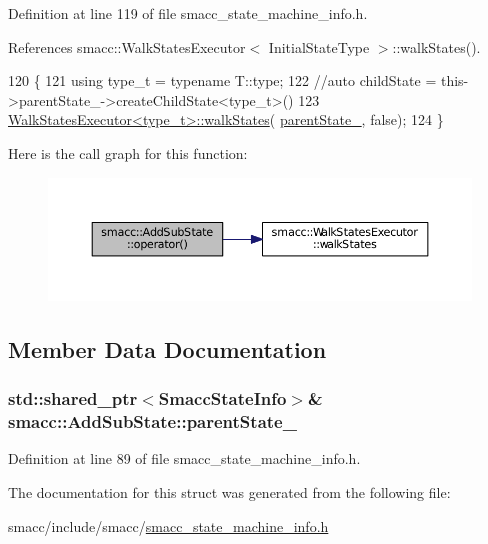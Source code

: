 Definition at line 119 of file smacc\+\_\+state\+\_\+machine\+\_\+info.\+h.



References smacc\+::\+Walk\+States\+Executor$<$ Initial\+State\+Type $>$\+::walk\+States().


\begin{DoxyCode}
120 \{
121     \textcolor{keyword}{using} type\_t = \textcolor{keyword}{typename} T::type;
122     \textcolor{comment}{//auto childState = this->parentState\_->createChildState<type\_t>()}
123     \hyperlink{structsmacc_1_1WalkStatesExecutor_a11a2b02eafb62ec298bcf5ffbb32848b}{WalkStatesExecutor<type\_t>::walkStates}(
      \hyperlink{structsmacc_1_1AddSubState_a24aaa4e3dbe9722ce100f24b73207cd6}{parentState\_}, \textcolor{keyword}{false});
124 \}
\end{DoxyCode}


Here is the call graph for this function\+:
\nopagebreak
\begin{figure}[H]
\begin{center}
\leavevmode
\includegraphics[width=350pt]{structsmacc_1_1AddSubState_a24b6d9a40ca08289e36562d26f1b863c_cgraph}
\end{center}
\end{figure}




\subsection{Member Data Documentation}
\subsubsection[{\texorpdfstring{parent\+State\+\_\+}{parentState_}}]{\setlength{\rightskip}{0pt plus 5cm}std\+::shared\+\_\+ptr$<${\bf Smacc\+State\+Info}$>$\& smacc\+::\+Add\+Sub\+State\+::parent\+State\+\_\+}\hypertarget{structsmacc_1_1AddSubState_a24aaa4e3dbe9722ce100f24b73207cd6}{}\label{structsmacc_1_1AddSubState_a24aaa4e3dbe9722ce100f24b73207cd6}


Definition at line 89 of file smacc\+\_\+state\+\_\+machine\+\_\+info.\+h.



The documentation for this struct was generated from the following file\+:\begin{DoxyCompactItemize}
\item 
smacc/include/smacc/\hyperlink{smacc__state__machine__info_8h}{smacc\+\_\+state\+\_\+machine\+\_\+info.\+h}\end{DoxyCompactItemize}
